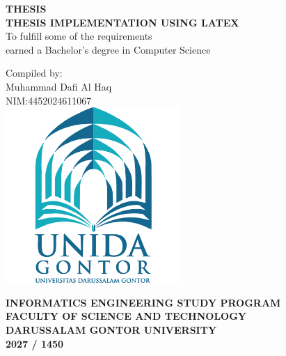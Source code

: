 \begin{titlepage}
	\centering
	{\bfseries THESIS}\\ %
	{\bfseries THESIS IMPLEMENTATION USING LATEX}\\ %
	
	\vspace*{0.5cm}
	{To fulfill some of the requirements\\}
	{earned a Bachelor's degree in Computer Science\\}
	
	\vspace*{0.5cm}
	{Compiled by:}\\
	{Muhammad Dafi Al Haq}\\  %
	{NIM:4452024611067 }\\ %
	
	\vspace{2cm}
	\includegraphics[width=0.5\textwidth]{assets/logo.png}
	
	\vspace*{2cm}
	{\bfseries INFORMATICS ENGINEERING STUDY PROGRAM\\} %
	{\bfseries FACULTY OF SCIENCE AND TECHNOLOGY\\}
	{\bfseries DARUSSALAM GONTOR UNIVERSITY\\} 
	{\bfseries 2027 / 1450\\}	%
\end{titlepage}

